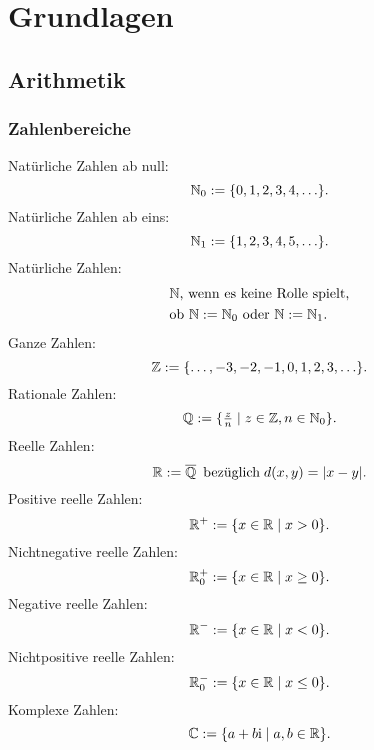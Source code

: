 
\chapter{Grundlagen}
\section{Arithmetik}
\subsection{Zahlenbereiche}
Natürliche Zahlen ab null:
\begin{equation}
\mathbb N_0 := \{0,1,2,3,4,\ldots\}.
\end{equation}
Natürliche Zahlen ab eins:
\begin{equation}
\mathbb N_1 := \{1,2,3,4,5,\ldots\}.
\end{equation}
Natürliche Zahlen:
\begin{equation}
\begin{split}
&\text{$\mathbb N$, wenn es keine Rolle spielt,}\\
&\text{ob $\mathbb N:=\mathbb N_0$ oder $\mathbb N:=\mathbb N_1$}.
\end{split}
\end{equation}
Ganze Zahlen:
\begin{equation}
\mathbb Z := \{\ldots,-3,-2,-1,0,1,2,3,\ldots\}.
\end{equation}
Rationale Zahlen:
\begin{equation}
\mathbb Q := \{\tfrac{z}{n}\mid z\in\mathbb Z,n\in\mathbb N_0\}.
\end{equation}
Reelle Zahlen:
\begin{equation}
\mathbb R := \overline{\mathbb Q}\enspace\text{bezüglich}\; d(x,y)=|x-y|.
\end{equation}
Positive reelle Zahlen:
\begin{equation}
\mathbb R^+ := \{x\in\mathbb R\mid x>0\}.
\end{equation}
Nichtnegative reelle Zahlen:
\begin{equation}
\mathbb R_0^+ := \{x\in\mathbb R\mid x\ge 0\}.
\end{equation}
Negative reelle Zahlen:
\begin{equation}
\mathbb R^- := \{x\in\mathbb R\mid x<0\}.
\end{equation}
Nichtpositive reelle Zahlen:
\begin{equation}
\mathbb R_0^- := \{x\in\mathbb R\mid x\le 0\}.
\end{equation}
Komplexe Zahlen:
\begin{equation}
\mathbb C := \{a+b\mathrm i\mid a,b\in\mathbb R\}.
\end{equation}
